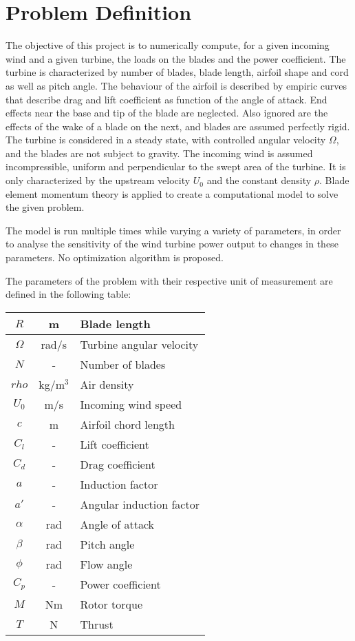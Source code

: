 \chapter{Problem Definition}

The objective of this project is to numerically compute, for a given incoming wind and a given turbine, the loads on the blades and the power coefficient. The turbine is characterized by number of blades, blade length, airfoil shape and cord as well as pitch angle. The behaviour of the airfoil is described by empiric curves that describe drag and lift coefficient as function of the angle of attack. End effects near the base and tip of the blade are neglected. Also ignored are the effects of the wake of a blade on the next, and blades are assumed perfectly rigid. The turbine is considered in a steady state, with controlled angular velocity $\Omega$, and the blades are not subject to gravity. The incoming wind is assumed incompressible, uniform and perpendicular to the swept area of the turbine. It is only characterized by the upstream velocity $U_0$ and the constant density $\rho$. Blade element momentum theory is applied to create a computational model to solve the given problem.

The model is run multiple times while varying a variety of parameters, in order to analyse the sensitivity of the wind turbine power output to changes in these parameters. No optimization algorithm is proposed.

The parameters of the problem with their respective unit of measurement are defined in the following table:

\begin{center}
\begin{tabular}{|c|c|l|}
	\hline
	$R$ & m & Blade length \\
	\hline
	$\Omega$ & rad/s & Turbine angular velocity \\
	\hline	
	$N$ & - & Number of blades \\
	\hline
	$rho$ & kg/m$^3$ & Air density \\
	\hline	
	$U_0$ & m/s & Incoming wind speed \\
	\hline
	$c$ & m & Airfoil chord length \\
	\hline
	$C_l$ & - & Lift coefficient \\
	\hline	
	$C_d$ & - & Drag coefficient \\
	\hline	
	$a$ & - & Induction factor \\
	\hline	
	$a'$ & - & Angular induction factor \\
	\hline	
	$\alpha$ & rad & Angle of attack \\
	\hline	
	$\beta$ & rad & Pitch angle \\
	\hline	
	$\phi$ & rad & Flow angle \\
	\hline		
	$C_p$ & - & Power coefficient \\
	\hline		
	$M$ & Nm & Rotor torque \\
	\hline		
	$T$ & N & Thrust \\
	\hline
\end{tabular}
\end{center}
	